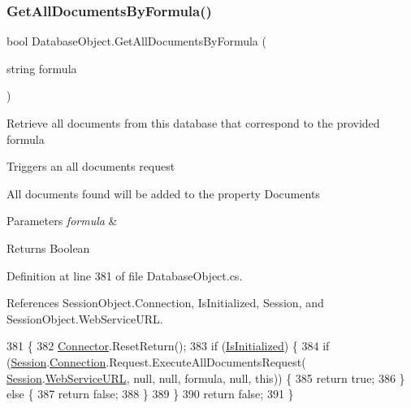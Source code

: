 \subsubsection{\texorpdfstring{Get\+All\+Documents\+By\+Formula()}{GetAllDocumentsByFormula()}}
{\footnotesize\ttfamily bool Database\+Object.\+Get\+All\+Documents\+By\+Formula (\begin{DoxyParamCaption}\item[{string}]{formula }\end{DoxyParamCaption})}



Retrieve all documents from this database that correspond to the provided formula 

Triggers an all documents request

All documents found will be added to the property \textquotesingle{}Documents\textquotesingle{}


\begin{DoxyParams}{Parameters}
{\em formula} & \\
\hline
\end{DoxyParams}
\begin{DoxyReturn}{Returns}
Boolean
\end{DoxyReturn}


Definition at line 381 of file Database\+Object.\+cs.



References Session\+Object.\+Connection, Is\+Initialized, Session, and Session\+Object.\+Web\+Service\+U\+RL.


\begin{DoxyCode}
381                                                          \{
382         \mbox{\hyperlink{class_connector}{Connector}}.ResetReturn();
383         \textcolor{keywordflow}{if} (\mbox{\hyperlink{class_database_object_a5fe036d32a30eb10d1b3f6a30263f740}{IsInitialized}}) \{
384             \textcolor{keywordflow}{if} (\mbox{\hyperlink{class_database_object_aa8484162b7d2a7c4c9426bca13c64c07}{Session}}.\mbox{\hyperlink{class_session_object_a014bdbf705a753540e19bfb53030c55c}{Connection}}.Request.ExecuteAllDocumentsRequest(
      \mbox{\hyperlink{class_database_object_aa8484162b7d2a7c4c9426bca13c64c07}{Session}}.\mbox{\hyperlink{class_session_object_a697c071c812fbf7ad1166b896fb44c16}{WebServiceURL}}, null, null, formula, null, \textcolor{keyword}{this})) \{
385                 \textcolor{keywordflow}{return} \textcolor{keyword}{true};
386             \} \textcolor{keywordflow}{else} \{
387                 \textcolor{keywordflow}{return} \textcolor{keyword}{false};
388             \}
389         \}
390         \textcolor{keywordflow}{return} \textcolor{keyword}{false};
391     \}
\end{DoxyCode}
\mbox{\label{class_database_object_ad4834e7677cd0418969a657eed99653c}} 
